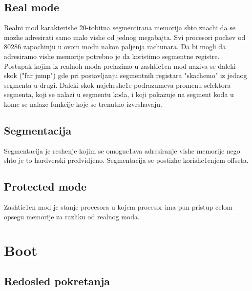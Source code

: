 \documentclass[a4paper,fleqn,12pt]{JMThesis}
\newcommand\eng{\fontencoding{OT1}\fontfamily{\rmdefault}\selectfont}
\begin{document}
\section{{\eng Real mode}}
\medskip

Realni mod karakterishe 20-tobitna segmentirana memorija shto znachi da se
mozhe adresirati samo malo vishe od jednog megabajta. Svi procesori pochev od
80286 zapochinju u ovom modu nakon paljenja rachunara. Da bi mogli da
adresiramo vishe memorije potrebno je da koristimo segmentne registre.\\

Postupak kojim iz realnoh moda prelazimo u zashtic1en mod naziva se daleki skok
{\eng ("far jump")} gde pri postavljanju segmentnih registara "skachemo" iz
jednog segmenta u drugi. Daleki skok najchesh\/c1e podrazumeva promenu selektora
segmenta, koji se nalazi u segmentu koda, i koji pokazuje na segment koda u
kome se nalaze funkcije koje se trenutno izvrshavaju.

\section{Segmentacija}
\medskip

Segmentacija je reshenje kojim se omoguc1ava adresiranje vishe memorije nego
shto je to hardverski predvidjeno. Segmentacija se postizhe korish\/c1enjem
offseta.


\section{{\eng Protected mode}}
\medskip

Zashtic1en mod je stanje procesora u kojem procesor ima pun pristup celom
opsegu
memorije za razliku od realnog moda.


\chapter{{\eng Boot}}

\section{Redosled pokretanja}
\medskip
\end{document}
